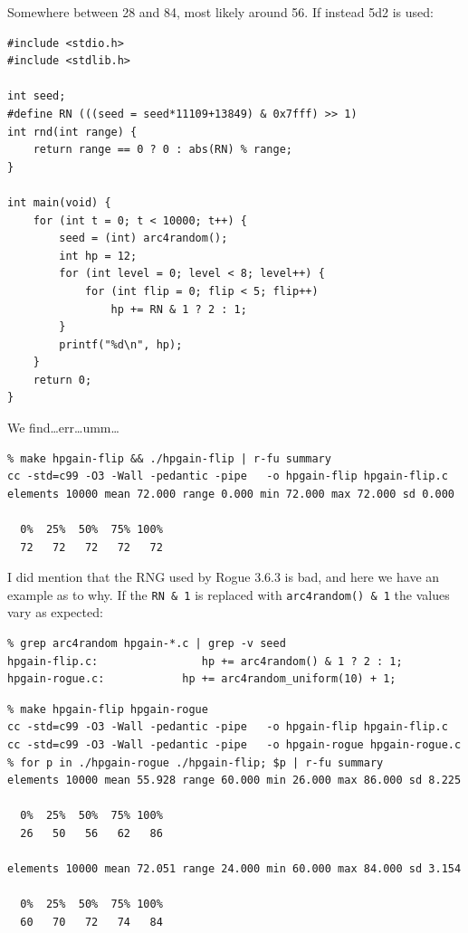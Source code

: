 \documentclass[12pt,a4paper]{article}
\begin{document}
Somewhere between 28 and 84, most likely around 56. If instead
5d2 is used:

\begin{verbatim}
#include <stdio.h>
#include <stdlib.h>

int seed;
#define RN (((seed = seed*11109+13849) & 0x7fff) >> 1)
int rnd(int range) {
    return range == 0 ? 0 : abs(RN) % range;
}

int main(void) {
    for (int t = 0; t < 10000; t++) {
        seed = (int) arc4random();
        int hp = 12;
        for (int level = 0; level < 8; level++) {
            for (int flip = 0; flip < 5; flip++)
                hp += RN & 1 ? 2 : 1;
        }
        printf("%d\n", hp);
    }
    return 0;
}
\end{verbatim}

We find\ldots err\ldots umm\ldots

\begin{verbatim}
% make hpgain-flip && ./hpgain-flip | r-fu summary                             
cc -std=c99 -O3 -Wall -pedantic -pipe   -o hpgain-flip hpgain-flip.c           
elements 10000 mean 72.000 range 0.000 min 72.000 max 72.000 sd 0.000          

  0%  25%  50%  75% 100%
  72   72   72   72   72
\end{verbatim}

I did mention that the RNG used by Rogue 3.6.3 is bad, and here we have
an example as to why. If the \texttt{RN \& 1} is replaced with
\texttt{arc4random() \& 1} the values vary as expected:

\begin{verbatim}
% grep arc4random hpgain-*.c | grep -v seed
hpgain-flip.c:                hp += arc4random() & 1 ? 2 : 1;
hpgain-rogue.c:            hp += arc4random_uniform(10) + 1;
\end{verbatim}
\begin{verbatim}
% make hpgain-flip hpgain-rogue   
cc -std=c99 -O3 -Wall -pedantic -pipe   -o hpgain-flip hpgain-flip.c 
cc -std=c99 -O3 -Wall -pedantic -pipe   -o hpgain-rogue hpgain-rogue.c 
% for p in ./hpgain-rogue ./hpgain-flip; $p | r-fu summary                     
elements 10000 mean 55.928 range 60.000 min 26.000 max 86.000 sd 8.225         

  0%  25%  50%  75% 100%
  26   50   56   62   86

elements 10000 mean 72.051 range 24.000 min 60.000 max 84.000 sd 3.154

  0%  25%  50%  75% 100% 
  60   70   72   74   84 
\end{verbatim}
\end{document}
